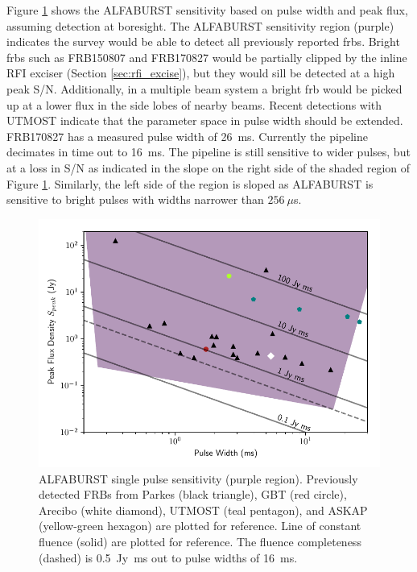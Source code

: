 \documentclass[a4paper,fleqn,usenatbib]{mnras}
\begin{document}
Figure \ref{fig:sensitivity_range} shows the ALFABURST sensitivity  based on
pulse width and peak flux, assuming detection at boresight. The ALFABURST
sensitivity region (purple) indicates the survey would be able to detect all
previously reported \glspl{frb}. Bright \glspl{frb} such as FRB150807 and
FRB170827 would be partially clipped by the inline RFI exciser (Section
\ref{sec:rfi_excise}), but they would sill be detected at a high peak S/N.
Additionally, in a multiple beam system a bright \gls{frb} would be
picked up at a lower flux in the side lobes of nearby beams. Recent detections
with UTMOST \citep{2017MNRAS.468.3746C,atel10697,atel10867} indicate that the
parameter space in pulse width should be extended.  FRB170827 has a measured
pulse width of 26~ms. Currently the pipeline decimates in time out to 16~ms. The
pipeline is still sensitive to wider pulses, but at a loss in S/N as indicated
in the slope on the right side of the shaded region of Figure
\ref{fig:sensitivity_range}.  Similarly, the left side of the region is sloped
as ALFABURST is sensitive to bright pulses with widths narrower than $256~\mu$s.

\begin{figure}
    \includegraphics[width=1.0\linewidth]{figures/sensitivity_range.pdf}
    \caption{ALFABURST single pulse sensitivity (purple region).
    Previously detected FRBs from Parkes (black triangle), GBT
    (red circle), Arecibo (white diamond), UTMOST (teal pentagon), and ASKAP
    (yellow-green hexagon) are plotted for reference. Line of constant fluence
    (solid) are plotted for reference. The fluence completeness (dashed) is
    0.5~Jy~ms out to pulse widths of 16~ms.
    }
    \label{fig:sensitivity_range}
\end{figure}
\end{document}

